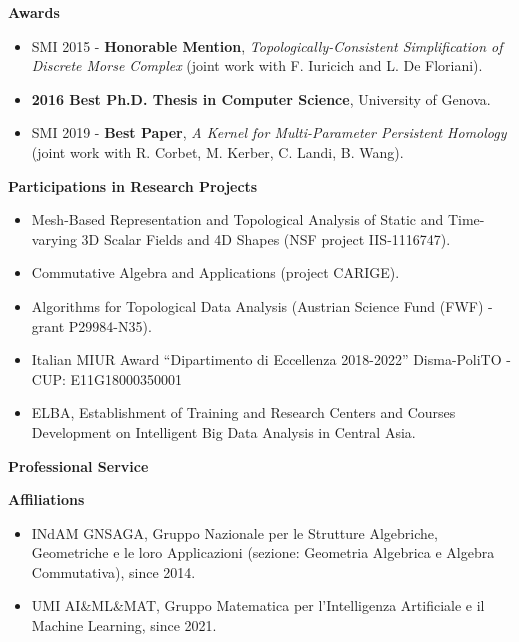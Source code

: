 \documentclass[11pt]{article}
\begin{document}
\vspace*{2.5ex}
\noindent
{\Large\bf Awards}
\begin{itemize}
\item SMI 2015 - {\bf Honorable Mention}, {\em Topologically-Consistent Simplification of Discrete Morse Complex} (joint work with F. Iuricich and L. De Floriani).
\item {\bf 2016 Best Ph.D. Thesis in Computer Science}, University of Genova.
\item SMI 2019 - {\bf Best Paper}, {\em A Kernel for Multi-Parameter Persistent Homology} (joint work with R. Corbet, M. Kerber, C. Landi, B. Wang).
\end{itemize}


\vspace*{2.5ex}
\noindent
{\Large\bf Participations in Research Projects}
\begin{itemize}
\item Mesh-Based Representation and Topological Analysis of Static and Time-varying 3D Scalar Fields and 4D Shapes (NSF project IIS-1116747).
\item Commutative Algebra and Applications (project CARIGE).
\item Algorithms for Topological Data Analysis (Austrian Science Fund (FWF) - grant P29984-N35).
\item Italian MIUR Award ``Dipartimento di Eccellenza 2018-2022'' Disma-PoliTO - CUP: E11G18000350001
\item ELBA, Establishment of Training and Research Centers and Courses Development on Intelligent Big Data Analysis in Central Asia.
\end{itemize}




\vspace*{2.5ex}
\noindent
{\Large\bf Professional Service}

\vspace*{1.5ex}
\noindent
{\bf Affiliations}
\begin{itemize}
  \item INdAM GNSAGA, Gruppo Nazionale per le Strutture Algebriche, Geometriche e le loro Applicazioni (sezione: Geometria Algebrica e Algebra Commutativa), since 2014.
  \item UMI AI\&ML\&MAT, Gruppo Matematica per l'Intelligenza Artificiale e il Machine Learning, since 2021.
\end{itemize}
\end{document}
